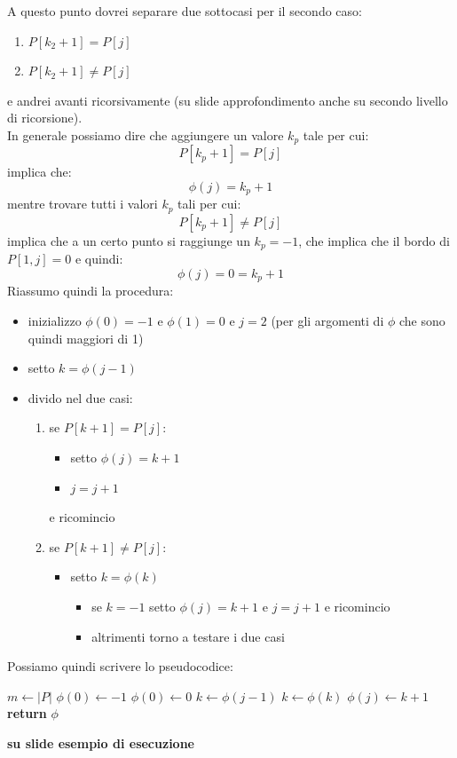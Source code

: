 \documentclass[a4paper,12pt, oneside]{book}
\begin{document}
\begin{definizione}
\begin{enumerate}
  \end{enumerate}
  A questo punto dovrei separare due sottocasi per il secondo caso:
  \begin{enumerate}
    \item $P[k_2+1] = P[j]$
    \item $P[k_2+1] \neq P[j]$
  \end{enumerate}
  e andrei avanti ricorsivamente (su slide approfondimento anche su secondo
  livello di ricorsione).\\
  In generale possiamo dire che aggiungere un valore $k_p$ tale per cui:
  \[P[k_p+1]=P[j]\]
  implica che:
  \[\phi(j)=k_p+1\]
  mentre trovare tutti i valori $k_p$ tali per cui:
  \[P[k_p+1]\neq P[j]\]
  implica che a un certo punto si raggiunge un $k_p = -1$, che implica che il
  bordo 
  di $P[1,j]=0$ e quindi:
  \[\phi(j)=0=k_p+1\]
  Riassumo quindi la procedura:
  \begin{itemize}
    \item inizializzo $\phi(0)=-1$ e $\phi(1)=0$ e $j=2$ (per gli argomenti di
    $\phi$ che sono quindi maggiori di 1)
    \item setto $k=\phi(j-1)$
    \item divido nel due casi:
    \begin{enumerate}
      \item se $P[k+1] = P[j] $:
      \begin{itemize}
        \item setto $\phi(j)=k+1$
        \item $j=j+1$
      \end{itemize}
      e ricomincio
      \item se $P[k+1] \neq P[j] $:
      \begin{itemize}
        \item setto $k=\phi(k)$
        \begin{itemize}
          \item se $k=-1$ setto $\phi(j)=k+1$ e $j=j+1$ e ricomincio 
          \item altrimenti torno a testare i due casi
        \end{itemize}
      \end{itemize}
    \end{enumerate}
  \end{itemize}
  \newpage
  Possiamo quindi scrivere lo pseudocodice:
  \begin{algorithm}[H]
    \begin{algorithmic}
      \State $m\gets |P|$
      \State $\phi(0)\gets -1$
      \State $\phi(0)\gets 0$
      \State $k\gets \phi(j-1)$
      \State $k \gets \phi(k)$
      \EndWhile
      \State $\phi(j)\gets k+1$
      \EndFor
      \State \textbf{return} $\phi$
      \EndFunction
    \end{algorithmic}
  \end{algorithm}
  \textbf{su slide esempio di esecuzione}
\end{definizione}
\end{document}
